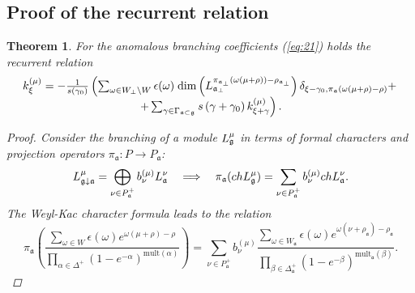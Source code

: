 \documentclass[12pt]{iopart}
\newtheorem{theorem}{Theorem}
\theoremstyle{definition}
\theoremstyle{definition}
\theoremstyle{definition}
\begin{document}
\subsection{Proof of the recurrent relation}
\label{sec:proof}
\begin{theorem}
  For the anomalous branching coefficients (\ref{eq:21}) holds the recurrent relation
  \begin{equation}
    \label{eq:1}
    \label{recurrent-relation}
    \begin{array}{c}
      k_{\xi }^{\left( \mu \right) }=-\frac{1}{s\left( \gamma _{0}\right) }\left(
        \sum_{\omega\in W_{\bot}\backslash W} \epsilon(\omega)\;
        {\rm dim}\left(L^{\pi_{\mathfrak{a}_{\bot}}(\omega(\mu+\rho))-\rho_{\mathfrak{a}_{\bot}}}_{\mathfrak{a}_{\bot}}\right)
        \delta_{\xi-\gamma_0,\pi_{\mathfrak{a}}(\omega(\mu+\rho)-\rho)}+ \right.\\
      \left.
        +\sum_{\gamma \in
          \Gamma _{\frak{a}\subset \frak{g}}}s\left( \gamma +\gamma _{0}\right) k_{\xi
          +\gamma }^{\left( \mu \right) }\right).
    \end{array}
  \end{equation}
  \begin{proof}
    Consider the branching of a module $L_{\frak{g}}^{\mu }$ in terms of formal characters and
    projection operators $\pi_{\mathfrak{a}}:P\to P_{\mathfrak{a}}$:
    \begin{equation*}
      L_{\frak{g}\downarrow \frak{a}}^{\mu }=\bigoplus\limits_{\nu \in P_{\frak{a}%
        }^{+}}b_{\nu }^{\left( \mu \right) }L_{\frak{a}}^{\nu }\quad
      \Longrightarrow\quad
      \pi_{\mathfrak{a}}(ch L^{\mu}_{\mathfrak{g}})=
      \sum_{\nu\in P^{+}_{\mathfrak{a}}}b^{(\mu)}_{\nu} ch L^{\nu}_{\mathfrak{a}}.
    \end{equation*}
    The Weyl-Kac character formula leads to
    the relation
    \begin{equation}
      \label{eq:4}
      \pi_{\mathfrak{a}}\left(\frac{\sum_{\omega\in W} \epsilon(\omega) e^{\omega(\mu+\rho)-\rho}}
        {\prod_{\alpha\in\Delta^{+}}(1-e^{-\alpha})^{\mathrm{mult}(\alpha)}}\right) =
      \sum_{\nu\in P^{+}_{\mathfrak{a}}}b^{(\mu)}_{\nu}
      \frac{\sum_{\omega\in W_{\mathfrak{a}}}\epsilon(\omega)
        e^{\omega(\nu+\rho_{\mathfrak{a}})-\rho_{\mathfrak{a}}}}
      {\prod_{\beta\in \Delta_{\mathfrak{a}}^{+}}(1-e^{-\beta})^{\mathrm{mult}_{\mathfrak{a}}(\beta)}}.
    \end{equation}


\end{proof}
\end{theorem}
\end{document}
